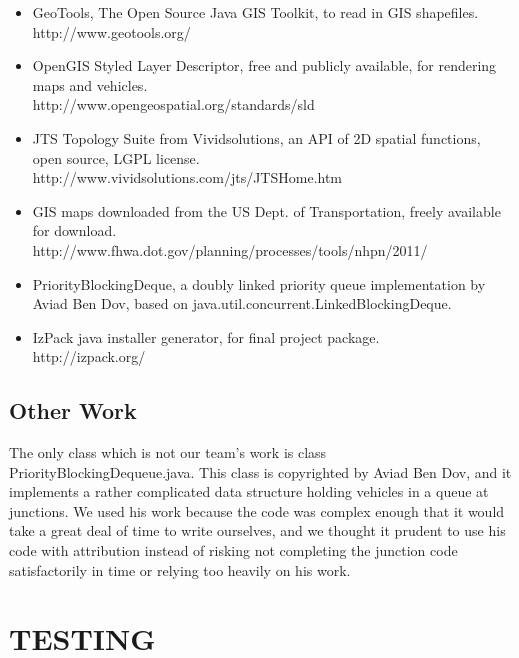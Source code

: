 \documentclass[11pt]{article}
\begin{document}
\begin{enumerate}
\begin{itemize}
\item GeoTools, The Open Source Java GIS Toolkit, to read in GIS shapefiles.
\\
http://www.geotools.org/

\item OpenGIS Styled Layer Descriptor, free and publicly available, for rendering maps and vehicles.
\\
http://www.opengeospatial.org/standards/sld

\item JTS Topology Suite from Vividsolutions, an API of 2D spatial functions, open source, LGPL license.
\\
http://www.vividsolutions.com/jts/JTSHome.htm

\item GIS maps downloaded from the US Dept. of Transportation, freely available for download.
\\
http://www.fhwa.dot.gov/planning/processes/tools/nhpn/2011/

\item PriorityBlockingDeque, a doubly linked priority queue implementation by Aviad Ben Dov, based on java.util.concurrent.LinkedBlockingDeque.

\item IzPack java installer generator, for final project package. 
\\
http://izpack.org/

\end{itemize}


\subsection{Other Work}

The only class which is not our team\textquoteright s work is class PriorityBlockingDequeue.java. This class is copyrighted by Aviad Ben Dov, and it implements a rather complicated data structure holding vehicles in a queue at junctions. We used his work because the code was complex enough that it would take a great deal of time to write ourselves, and we thought it prudent to use his code with attribution instead of risking not completing the junction code satisfactorily in time or relying too heavily on his work.



\section{TESTING}




\end{enumerate}
\end{document}
